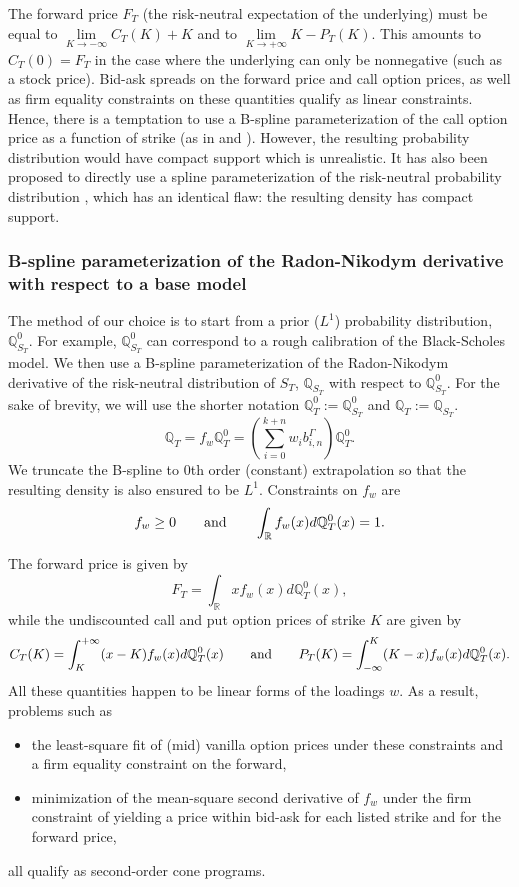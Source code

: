\documentclass[a4paper]{article}
\newcommand{\1}{\textbf{1}}
\newcommand{\Q}{\mathbb{Q}}
\newcommand{\R}{\mathbb{R}}
\begin{document}
\par The forward price $F_T$ (the risk-neutral expectation of the underlying) must be equal to $\lim\limits_{K \to -\infty} C_T(K) + K$ and to $\lim\limits_{K \to +\infty} K - P_T(K)$. This amounts to $C_T(0) = F_T$ in the case where the underlying can only be nonnegative (such as a stock price). Bid-ask spreads on the forward price and call option prices, as well as firm equality constraints on these quantities qualify as linear constraints. Hence, there is a temptation to use a B-spline parameterization of the call option price as a function of strike (as in \cite{LauriniSplines} and \cite{FenglerSmoothing}). However, the resulting probability distribution would have compact support which is unrealistic. It has also been proposed to directly use a spline parameterization of the risk-neutral probability distribution \cite{MonteiroSplinePDF}, which has an identical flaw: the resulting density has compact support. 
\subsubsection*{B-spline parameterization of the Radon-Nikodym derivative with respect to a base model}
\par The method of our choice is to start from a prior ($L^1$) probability distribution, $\Q^0_{S_T}$. For example, $\Q^0_{S_T}$ can correspond to a rough calibration of the Black-Scholes model. We then use a B-spline parameterization of the Radon-Nikodym derivative of the risk-neutral distribution of $S_T$, $\Q_{S_T}$ with respect to $\Q^0_{S_T}$. For the sake of brevity, we will use the shorter notation $\Q^0_T:=\Q^0_{S_T}$ and $\Q_T:=\Q_{S_T}$.
$$
\Q_T = f_w \Q^0_T = \left(\sum\limits_{i = 0}^{k + n} w_i b^\Gamma_{i,n}\right) \Q^0_T.
$$
We truncate the B-spline to $0$th order (constant) extrapolation so that the resulting density is also ensured to be $L^1$. Constraints on $f_w$ are
$$
f_w \geq 0 \qquad \textnormal{and} \qquad \int_\R f_w(x) d\Q^0_T(x) = 1. 
$$
\par \noindent The forward price is given by 
$$
F_T = \int_\R x f_w(x) d\Q^0_T(x),
$$
while the undiscounted call and put option prices of strike $K$ are given by
$$
C_T(K) = \int_K^{+\infty} (x - K) f_w(x) d \Q^0_T(x) \qquad \textnormal{and} \qquad P_T(K) = \int_{-\infty}^K (K - x) f_w(x) d \Q^0_T(x).
$$
All these quantities happen to be linear forms of the loadings $w$. As a result, problems such as 
\begin{itemize}
\item the least-square fit of (mid) vanilla option prices under these constraints and a firm equality constraint on the forward,
\item minimization of the mean-square second derivative of $f_w$ under the firm constraint of yielding a price within bid-ask for each listed strike and for the forward price,
\end{itemize}
all qualify as second-order cone programs. 
\end{document}
